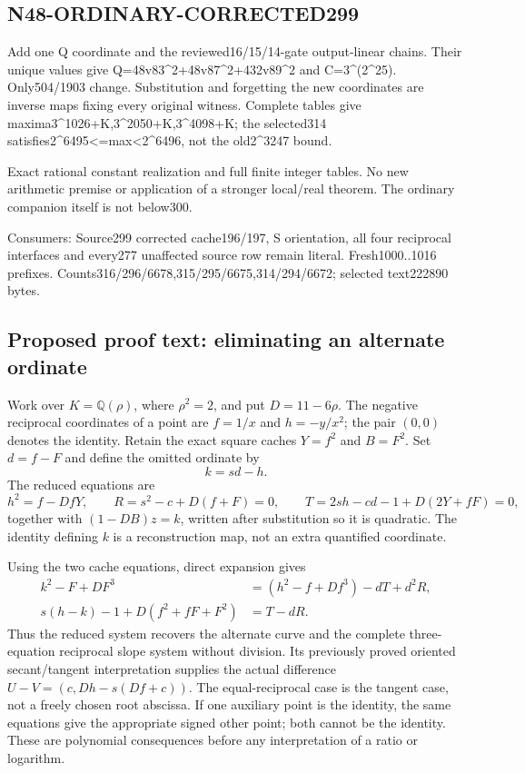 \documentclass{article}
\begin{document}
\subsection{N48-ORDINARY-CORRECTED299}
\label{outline:r6-n48-ordinary-corrected299}
Add one Q coordinate and the reviewed16/15/14-gate output-linear chains. Their unique values give Q=48v83\textasciicircum{}2+48v87\textasciicircum{}2+432v89\textasciicircum{}2 and C=3\textasciicircum{}(2\textasciicircum{}25). Only504/1903 change. Substitution and forgetting the new coordinates are inverse maps fixing every original witness. Complete tables give maxima3\textasciicircum{}1026+K,3\textasciicircum{}2050+K,3\textasciicircum{}4098+K; the selected314 satisfies2\textasciicircum{}6495<=max<2\textasciicircum{}6496, not the old2\textasciicircum{}3247 bound.
\par Exact rational constant realization and full finite integer tables. No new arithmetic premise or application of a stronger local/real theorem. The ordinary companion itself is not below300.
\par Consumers: Source299 corrected cache196/197, S orientation, all four reciprocal interfaces and every277 unaffected source row remain literal. Fresh1000..1016 prefixes. Counts316/296/6678,315/295/6675,314/294/6672; selected text222890 bytes.
\subsection{Proposed proof text: eliminating an alternate ordinate}
\label{outline:r6-expanded-elimination}
Work over $K=\mathbb Q(\rho)$, where $\rho^2=2$, and put
$D=11-6\rho$. The negative reciprocal coordinates of a point are
$f=1/x$ and $h=-y/x^2$; the pair $(0,0)$ denotes the identity.
Retain the exact square caches $Y=f^2$ and $B=F^2$.
Set $d=f-F$ and define the omitted ordinate by
\[
 k=sd-h.
\]
The reduced equations are
\[
 h^2=f-DfY,\qquad
 R=s^2-c+D(f+F)=0,\qquad
 T=2sh-cd-1+D(2Y+fF)=0,
\]
together with $(1-DB)z=k$, written after substitution so it is quadratic.
The identity defining $k$ is a reconstruction map, not an extra
quantified coordinate.

Using the two cache equations, direct expansion gives
\begin{align*}
 k^2-F+DF^3&=(h^2-f+Df^3)-dT+d^2R,\\
 s(h-k)-1+D(f^2+fF+F^2)&=T-dR.
\end{align*}
Thus the reduced system recovers the alternate curve and the complete
three-equation reciprocal slope system without division. Its previously
proved oriented secant/tangent interpretation supplies the actual
difference $U-V=(c,Dh-s(Df+c))$. The equal-reciprocal case is the tangent
case, not a freely chosen root abscissa. If one auxiliary point is the
identity, the same equations give the appropriate signed other point;
both cannot be the identity. These are polynomial consequences before
any interpretation of a ratio or logarithm.
\end{document}
